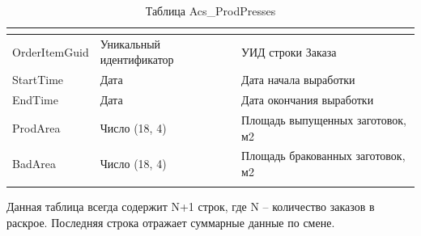 
\scriptsize
\begin{longtable}{|p{56mm}|p{56mm}|p{56mm}|}
\hline
{\bf \parbox[c][5mm]{56mm}{}} & {\bf \parbox[c]{56mm}{}} & {\bf \parbox[c]{56mm}{}} \\
\hline
\parbox[c][5mm]{56mm}{OrderItemGuid} & \parbox{56mm}{Уникальный идентификатор} & \parbox{56mm}{УИД строки Заказа} \\
\hline
\parbox[c][5mm]{56mm}{StartTime} & \parbox{56mm}{Дата} & \parbox{56mm}{Дата начала выработки} \\
\hline
\parbox[c][5mm]{56mm}{EndTime} & \parbox{56mm}{Дата} & \parbox{56mm}{Дата окончания выработки} \\
\hline
\parbox[c][10mm]{56mm}{ProdArea} & \parbox{56mm}{Число (18, 4)} & \parbox{56mm}{Площадь выпущенных заготовок, м2} \\
\hline
\parbox[c][10mm]{56mm}{BadArea} & \parbox{56mm}{Число (18, 4)} & \parbox{56mm}{Площадь бракованных заготовок, м2} \\
\hline
\caption{Таблица Acs\_ProdPresses}\label{tab:Acs_ProdPresses}
\end{longtable}  
\normalsize




Данная таблица всегда содержит N+1 строк, где N – количество заказов в раскрое. Последняя строка отражает суммарные данные по смене.





